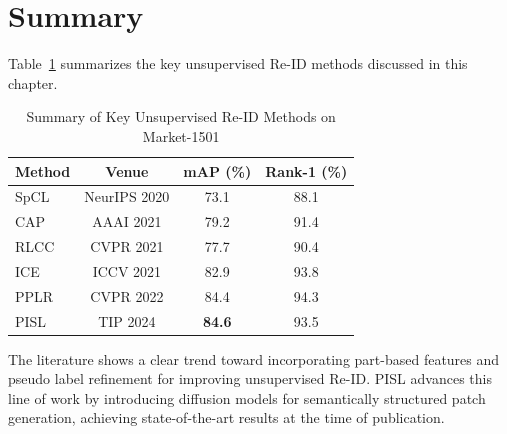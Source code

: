 \section{Summary}

Table~\ref{tab:lit_summary} summarizes the key unsupervised Re-ID methods discussed in this chapter.

\begin{table}[H]
    \centering
    \caption{Summary of Key Unsupervised Re-ID Methods on Market-1501}
    \label{tab:lit_summary}
    \begin{tabular}{l c c c}
        \toprule
        \textbf{Method} & \textbf{Venue} & \textbf{mAP (\%)} & \textbf{Rank-1 (\%)} \\
        \midrule
        SpCL~\cite{ge2020selfpaced}        & NeurIPS 2020  & 73.1 & 88.1 \\
        CAP~\cite{wang2021cap}             & AAAI 2021     & 79.2 & 91.4 \\
        RLCC~\cite{zhang2021rlcc}          & CVPR 2021     & 77.7 & 90.4 \\
        ICE~\cite{chen2021ice}             & ICCV 2021     & 82.9 & 93.8 \\
        PPLR~\cite{cho2022pplr}            & CVPR 2022     & 84.4 & 94.3 \\
        PISL~\cite{tao2024unsupervised}    & TIP 2024      & \textbf{84.6} & 93.5 \\
        \bottomrule
    \end{tabular}
\end{table}

The literature shows a clear trend toward incorporating part-based features and pseudo label refinement for improving unsupervised Re-ID. PISL advances this line of work by introducing diffusion models for semantically structured patch generation, achieving state-of-the-art results at the time of publication.
